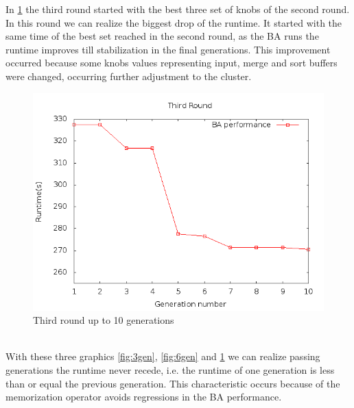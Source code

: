 In \ref{fig:10gen} the third round started  with the best three set of knobs
of the second round. In this round we can realize the biggest drop of the runtime.
It started with the same time of the best set reached in the second round,
as the BA runs the runtime improves till stabilization in the final generations.
This improvement occurred because some knobs values representing input, merge and
sort buffers were changed, occurring further adjustment to the cluster. 
\\
\begin{figure}[htbp]
\begin{center}
	\includegraphics[scale=0.7]{graphics/img/10gen.png}
\caption{Third round up to 10 generations} \label{fig:10gen}
\end{center}
\end{figure}
\\

With these three graphics \ref{fig:3gen}, \ref{fig:6gen} and \ref{fig:10gen}
we can realize passing generations the runtime
never recede, i.e. the runtime of one generation is less than or equal the
previous generation. This characteristic occurs because of the memorization operator
avoids regressions in the BA performance.
\\
\\
\\
\\
\\
\\
\\
\\
\\

